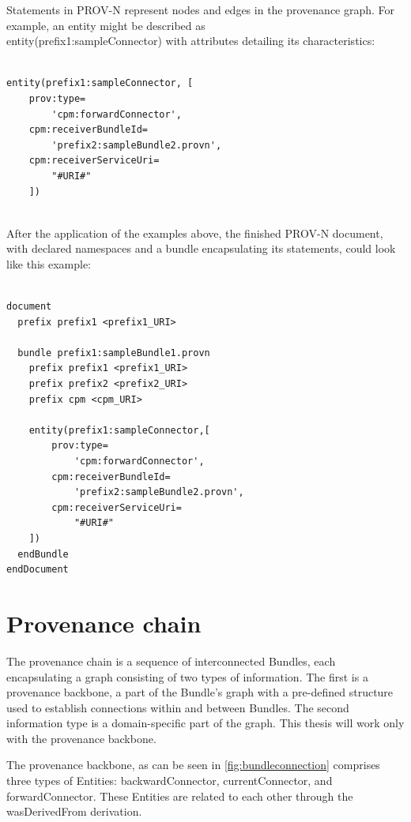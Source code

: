 \documentclass[
  digital,     %
  oneside,     %
  nosansbold,  %
  nocolorbold, %
  lof,         %
  lot,         %
]{fithesis4}
\begin{document}
Statements in PROV-N represent nodes and edges in the provenance graph. For example, an entity might be described as \\entity(prefix1:sampleConnector) with attributes detailing its characteristics:

\begin{verbatim}

entity(prefix1:sampleConnector, [
    prov:type=
        'cpm:forwardConnector', 
    cpm:receiverBundleId=
        'prefix2:sampleBundle2.provn', 
    cpm:receiverServiceUri=
        "#URI#"
    ])
    
\end{verbatim}

After the application of the examples above, the finished PROV-N document, with declared namespaces and a bundle encapsulating its statements, could look like this example:

\begin{verbatim}

document
  prefix prefix1 <prefix1_URI>

  bundle prefix1:sampleBundle1.provn
    prefix prefix1 <prefix1_URI>
    prefix prefix2 <prefix2_URI>
    prefix cpm <cpm_URI>

    entity(prefix1:sampleConnector,[
        prov:type=
            'cpm:forwardConnector',
        cpm:receiverBundleId=
            'prefix2:sampleBundle2.provn',
        cpm:receiverServiceUri=
            "#URI#"
    ])
  endBundle
endDocument

\end{verbatim}
\shorthandon{-}

\section{Provenance chain} \label{s-provchain}
\shorthandoff{-}
The provenance chain is a sequence of interconnected Bundles, each encapsulating a graph consisting of two types of information. The first is a provenance backbone, a part of the Bundle's graph with a pre-defined structure used to establish connections within and between Bundles. The second information type is a domain-specific part of the graph. This thesis will work only with the provenance backbone. 

The provenance backbone, as can be seen in \ref{fig:bundleconnection} comprises three types of Entities: backwardConnector, currentConnector, and forwardConnector. These Entities are related to each other through the wasDerivedFrom derivation. 
\end{document}
